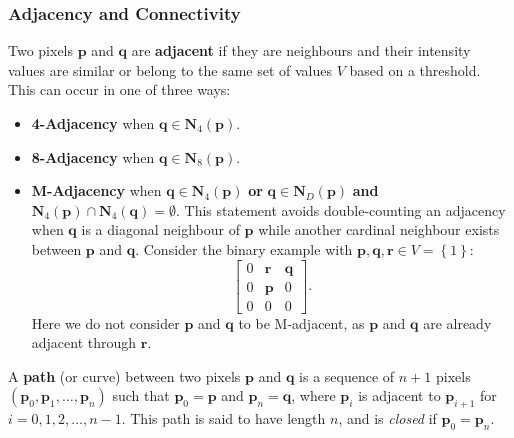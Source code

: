 \documentclass{article}
\begin{document}
\subsubsection{Adjacency and Connectivity}
Two pixels \(\symbf{p}\) and \(\symbf{q}\) are \textbf{adjacent} if
they are neighbours and their intensity values are similar or belong to
the same set of values \(V\) based on a threshold. This can occur in
one of three ways:
\begin{itemize}
    \item \textbf{4-Adjacency} when \(\symbf{q} \in \symbf{N}_4\left( \symbf{p} \right)\).
    \item \textbf{8-Adjacency} when \(\symbf{q} \in \symbf{N}_8\left( \symbf{p} \right)\).
    \item \textbf{M-Adjacency} when \(\symbf{q} \in \symbf{N}_4\left( \symbf{p} \right)\) \textbf{or} \(\symbf{q} \in \symbf{N}_D\left( \symbf{p} \right)\) \textbf{and} \(\symbf{N}_4\left( \symbf{p} \right) \cap \symbf{N}_4\left( \symbf{q} \right) = \emptyset\).
          This statement avoids double-counting an adjacency when
          \(\symbf{q}\) is a diagonal neighbour of \(\symbf{p}\) while
          another cardinal neighbour exists between \(\symbf{p}\) and
          \(\symbf{q}\). Consider the binary example with \(\symbf{p},\symbf{q},\symbf{r} \in V = \left\{ 1 \right\}\):
          \begin{equation*}
              \begin{bmatrix}
                  0 & \symbf{r} & \symbf{q} \\
                  0 & \symbf{p} & 0         \\
                  0 & 0         & 0
              \end{bmatrix}
              .
          \end{equation*}
          Here we do not consider \(\symbf{p}\) and \(\symbf{q}\) to be
          M-adjacent, as \(\symbf{p}\) and \(\symbf{q}\) are already
          adjacent through \(\symbf{r}\).
\end{itemize}
A \textbf{path} (or curve) between two pixels \(\symbf{p}\) and
\(\symbf{q}\) is a sequence of \(n+1\) pixels \(\left( \symbf{p}_0, \symbf{p}_1,
\ldots, \symbf{p}_n \right)\) such that \(\symbf{p}_0 = \symbf{p}\) and
\(\symbf{p}_n = \symbf{q}\), where \(\symbf{p}_i\) is adjacent to
\(\symbf{p}_{i+1}\) for \(i = 0, 1, 2, \ldots, n-1\). This path is said
to have length \(n\), and is \textit{closed} if \(\symbf{p}_0 = \symbf{p}_n\).
\end{document}
